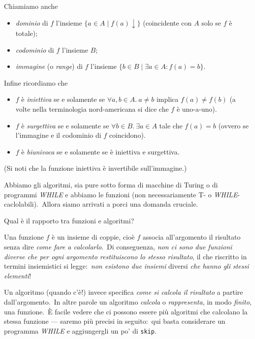\noindent Chiamiamo anche

\begin{itemize}
    \item \textit{dominio} di $f$ l'insieme $\{a\in A \; | \; f(a)\downarrow\}$ (coincidente con $A$ solo se $f$ è totale);
    \item \textit{codominio} di $f$ l'insieme $B$;
    \item \textit{immagine} (o \textit{range}) di $f$ l'insieme $\{b\in B \mid \exists a \in A : f(a)=b\}$.
\end{itemize}

\noindent Infine ricordiamo che

\begin{itemize}
    \item $f$ è \textit{iniettiva} se e solamente se $\forall a,b\in A.\ a\neq b$  implica $f(a)\neq f(b)$ (a volte nella terminologia nord-americana si dice che $f$ è uno-a-uno).
    \item $f$ è \textit{surgettiva} se e solamente se $\forall b \in B.\ \exists a \in A$ tale che $f(a)=b$ (ovvero se l'immagine e il codominio di $f$ coincidono).
    \item $f$ è \textit{biunivoca} se e solamente se è iniettiva e surgettiva.
\end{itemize}

\noindent (Si noti che la funzione iniettiva è invertibile sull'immagine.)

\vspace{12pt}

\noindent Abbiamo gli algoritmi, sia pure sotto forma di macchine di Turing o di programmi \textit{\footnotesize WHILE} e abbiamo le funzioni (non necessariamente T- o \textit{\footnotesize WHILE}-caclolabili).\
Allora siamo arrivati a porci una domanda cruciale.

\begin{question}
    Qual è il rapporto tra funzioni e algoritmi?
\end{question}

\noindent Una funzione $f$ è un insieme di coppie, cioè $f$ associa all'argomento il risultato senza dire \textit{come fare a calcolarlo}.\
Di conseguenza, \textit{non ci sono due funzioni diverse che per ogni argomento restituiscono lo stesso risultato}, il che riscritto in termini insiemistici si legge:\ \textit{non esistono due insiemi} diversi \textit{che hanno gli stessi elementi}!

Un algoritmo (quando c'è!) invece specifica \textit{come si calcola il risultato} a partire dall'argomento.\
In altre parole un algoritmo \textit{calcola} o \textit{rappresenta}, in modo \textit{finito}, una funzione.\
È facile vedere che ci possono essere più algoritmi che calcolano la stessa funzione --- saremo più precisi in seguito:\ qui basta considerare un programma \textit{\footnotesize WHILE} e aggiungergli un po' di \texttt{skip}.

